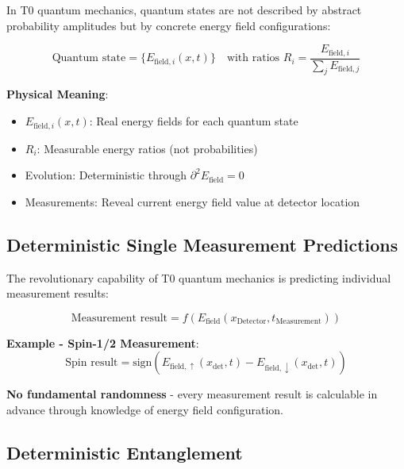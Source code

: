 \documentclass[12pt,a4paper]{article}
\theoremstyle{definition}
\theoremstyle{remark}
\begin{document}
	In T0 quantum mechanics, quantum states are not described by abstract probability amplitudes but by concrete energy field configurations:
	
	\begin{equation}
		\boxed{\text{Quantum state} = \{E_{\text{field},i}(x,t)\} \quad \text{with ratios } R_i = \frac{E_{\text{field},i}}{\sum_j E_{\text{field},j}}}
		\label{eq:deterministic_state}
	\end{equation}
	
	\textbf{Physical Meaning}:
	\begin{itemize}
		\item $E_{\text{field},i}(x,t)$: Real energy fields for each quantum state
		\item $R_i$: Measurable energy ratios (not probabilities)
		\item Evolution: Deterministic through $\partial^2 E_{\text{field}} = 0$
		\item Measurements: Reveal current energy field value at detector location
	\end{itemize}
	
	\subsection{Deterministic Single Measurement Predictions}
	
	The revolutionary capability of T0 quantum mechanics is predicting individual measurement results:
	
	\begin{equation}
		\boxed{\text{Measurement result} = f\left(E_{\text{field}}(x_{\text{Detector}}, t_{\text{Measurement}})\right)}
		\label{eq:deterministic_measurement}
	\end{equation}
	
	\textbf{Example - Spin-1/2 Measurement}:
	\begin{equation}
		\text{Spin result} = \text{sign}\left(E_{\text{field},\uparrow}(x_{\text{det}}, t) - E_{\text{field},\downarrow}(x_{\text{det}}, t)\right)
		\label{eq:spin_measurement}
	\end{equation}
	
	\textbf{No fundamental randomness} - every measurement result is calculable in advance through knowledge of energy field configuration.
	
	\subsection{Deterministic Entanglement}
	
\end{document}
